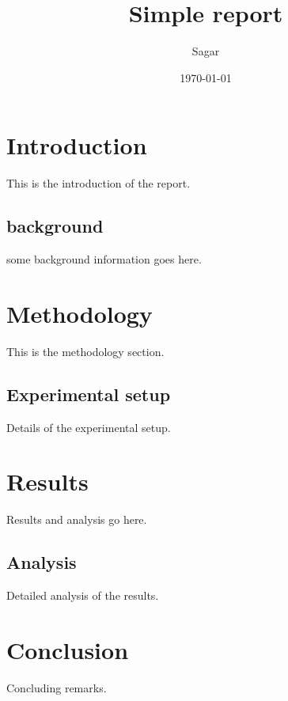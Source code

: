 \documentclass[a4paper,12pt]{report}
\title{Simple report}
\author{Sagar}
\date{\today}
\begin{document}
\maketitle
\chapter{Introduction}
This is the introduction of the report.
\section{background}
some background information goes here.
\chapter{Methodology}
This is the methodology section.
\section{Experimental setup}
Details of the experimental setup.
\chapter{Results}
Results and analysis go here.
\section{Analysis}
Detailed analysis of the results.
\chapter{Conclusion}
Concluding remarks.
\end{document}
